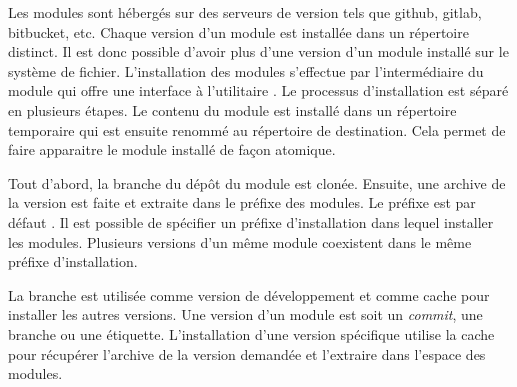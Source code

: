 




Les modules sont hébergés sur des serveurs de version tels que github, gitlab,
bitbucket, etc. Chaque version d'un module est installée dans un répertoire
distinct. Il est donc possible d'avoir plus d'une version d'un module installé
sur le système de fichier.
L'installation des modules s'effectue par l'intermédiaire du module
 qui offre une interface à l'utilitaire . Le
processus d'installation est séparé en plusieurs étapes.  Le contenu du module
est installé dans un répertoire temporaire qui est ensuite renommé au
répertoire de destination. Cela permet de faire apparaitre le module installé
de façon atomique.

Tout d'abord, la
branche  du dépôt du module est clonée. Ensuite, une archive de la
version est faite et extraite dans le préfixe des modules. Le préfixe est par
défaut .  Il est possible de spécifier un préfixe
d'installation dans lequel installer les modules. Plusieurs versions d'un même
module coexistent dans le même préfixe d'installation.

La branche  est utilisée comme version de développement et
comme cache pour installer les autres versions. Une version d'un module est soit
un \textit{commit}, une branche ou une étiquette. L'installation d'une version
spécifique utilise la cache pour récupérer l'archive de la version demandée
et l'extraire dans l'espace des modules.

